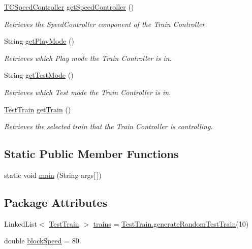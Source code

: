 \begin{DoxyCompactItemize}
\hyperlink{classTrainControllerComps_1_1TCSpeedController}{T\+C\+Speed\+Controller} \hyperlink{classTrainControllerComps_1_1TrainController_a563558b783b64d38ec5bc7f2bbd87930}{get\+Speed\+Controller} ()
\begin{DoxyCompactList}\small\item\em Retrieves the Speed\+Controller component of the Train Controller. \end{DoxyCompactList}\item 
String \hyperlink{classTrainControllerComps_1_1TrainController_af94f38bb5536923926d19272bfb5f0f2}{get\+Play\+Mode} ()
\begin{DoxyCompactList}\small\item\em Retrieves which Play mode the Train Controller is in. \end{DoxyCompactList}\item 
String \hyperlink{classTrainControllerComps_1_1TrainController_ad99a5958c029bc81fd2f28b386c7699e}{get\+Test\+Mode} ()
\begin{DoxyCompactList}\small\item\em Retrieves which Test mode the Train Controller is in. \end{DoxyCompactList}\item 
\hyperlink{classTrainControllerComps_1_1TestTrain}{Test\+Train} \hyperlink{classTrainControllerComps_1_1TrainController_aaa1cf5d5d3cae08191c34c680943f5f0}{get\+Train} ()
\begin{DoxyCompactList}\small\item\em Retrieves the selected train that the Train Controller is controlling. \end{DoxyCompactList}\end{DoxyCompactItemize}
\subsection*{Static Public Member Functions}
\begin{DoxyCompactItemize}
\item 
static void \hyperlink{classTrainControllerComps_1_1TrainController_acd05ad401373dbc58de1dc6927aff7ec}{main} (String args\mbox{[}$\,$\mbox{]})
\end{DoxyCompactItemize}
\subsection*{Package Attributes}
\begin{DoxyCompactItemize}
\item 
Linked\+List$<$ \hyperlink{classTrainControllerComps_1_1TestTrain}{Test\+Train} $>$ \hyperlink{classTrainControllerComps_1_1TrainController_ab69fa78b5560ce5fa8099162e3bc0761}{trains} = \hyperlink{classTrainControllerComps_1_1TestTrain_a9ac49f75c523af590e04e6feec2b2b0d}{Test\+Train.\+generate\+Random\+Test\+Train}(10)
\item 
double \hyperlink{classTrainControllerComps_1_1TrainController_a7148b1a765fb137613943debe6131592}{block\+Speed} = 80.
\end{DoxyCompactItemize}
